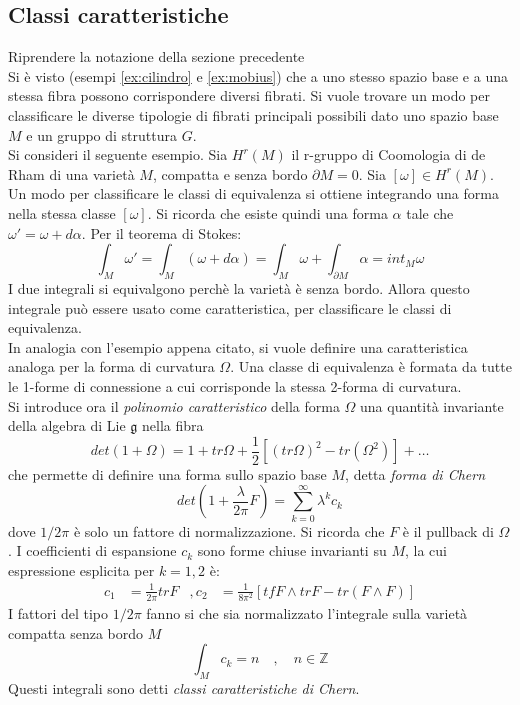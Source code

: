 \subsection{Classi caratteristiche}
Riprendere la notazione della sezione precedente \\

Si è visto (esempi \ref{ex:cilindro} e \ref{ex:mobius}) che a uno stesso spazio
base e a una stessa fibra possono corrispondere diversi fibrati. Si vuole trovare
un modo per classificare le diverse tipologie di fibrati principali possibili dato uno
spazio base $M$ e un gruppo di struttura $G$.\\

Si consideri il seguente esempio. Sia $H^r(M)$ il r-gruppo di Coomologia di de Rham
di una varietà $M$, compatta e senza bordo $\partial M = 0$.
Sia $[\omega] \in H^r(M)$.\\
Un modo per classificare le classi di equivalenza si ottiene integrando una forma
nella stessa classe $[\omega]$. Si ricorda che esiste quindi una forma $\alpha$
tale che $\omega' = \omega + d\alpha$. Per il teorema di Stokes:
$$ \int_M \omega' = \int_M (\omega + d\alpha) = \int_M \omega
   + \int_{\partial M} \alpha = int_M \omega $$
I due integrali si equivalgono perchè la varietà è senza bordo. Allora questo integrale
può essere usato come caratteristica, per classificare le classi di equivalenza.\\

In analogia con l'esempio appena citato, si vuole definire una caratteristica
analoga per la forma di curvatura $\Omega$. Una classe di equivalenza è formata
da tutte le 1-forme di connessione a cui corrisponde la stessa 2-forma di curvatura.\\
Si introduce ora il \emph{polinomio caratteristico} della forma $\Omega$ una quantità
invariante della algebra di Lie $\mathfrak{g}$ nella fibra
$$ det(1+\Omega) = 1 + tr\Omega + \frac{1}{2}[(tr\Omega)^2 - tr(\Omega^2)] + \dots $$
che permette di definire una forma sullo spazio base $M$, detta \emph{forma di Chern}
$$ det(1 + \frac{\lambda}{2\pi}F) = \sum_{k=0}^\infty \lambda^k c_k $$
dove $1/2\pi$ è solo un fattore di normalizzazione. Si ricorda che $F$ è il pullback
di $\Omega$. I coefficienti di espansione $c_k$ sono forme chiuse invarianti su $M$,
la cui espressione esplicita per $k = 1,2$ è:
\begin{equation}
   \begin{aligned}
      c_1 &= \frac{1}{2\pi} trF &,
      c_2 & = \frac{1}{8\pi^2}[ tfF \wedge trF - tr(F \wedge F)]
   \end{aligned}
\end{equation}
I fattori del tipo $1/2\pi$ fanno si che sia normalizzato l'integrale sulla varietà
compatta senza bordo $M$
\begin{equation}
   \int_M c_k = n \quad , \quad n \in \mathbb{Z}
\end{equation}
Questi integrali sono detti \emph{classi caratteristiche di Chern}.\\

